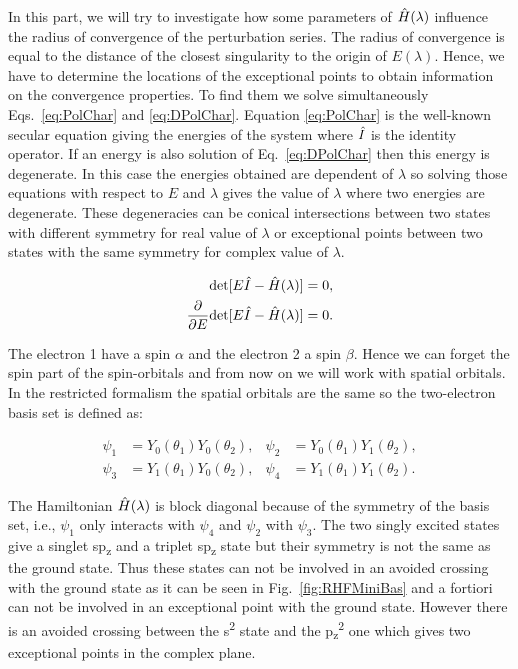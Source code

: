 \documentclass[11pt,a4paper]{article}
\newcommand{\hH}{\Hat{H}}
\newcommand{\hI}{\Hat{I}}
\begin{document}
In this part, we will try to investigate how some parameters of $\hH(\lambda)$ influence the radius of convergence of the perturbation series. The radius of convergence is equal to the distance of the closest singularity to the origin of $E(\lambda)$. Hence, we have to determine the locations of the exceptional points to obtain information on the convergence properties. To find them we solve simultaneously Eqs.~\eqref{eq:PolChar} and \eqref{eq:DPolChar}. Equation \eqref{eq:PolChar} is the well-known secular equation giving the energies of the system where $\hI$ is the identity operator. If an energy is also solution of Eq.~\eqref{eq:DPolChar} then this energy is degenerate. In this case the energies obtained are dependent of $\lambda$ so solving those equations with respect to $E$ and $\lambda$ gives the value of $\lambda$ where two energies are degenerate. These degeneracies can be conical intersections between two states with different symmetry for real value of $\lambda$ or exceptional points between two states with the same symmetry for complex value of $\lambda$.

\begin{subequations}
\begin{align}
	\label{eq:PolChar}
	\text{det}[E\hI-\hH(\lambda)] & = 0,
	\\ 
	\label{eq:DPolChar}
	\pdv{E}\text{det}[E\hI-\hH(\lambda)] & = 0.
\end{align}
\end{subequations}

The electron 1 have a spin $\alpha$ and the electron 2 a spin $\beta$. Hence we can forget the spin part of the spin-orbitals and from now on we will work with spatial orbitals. In the restricted formalism the spatial orbitals are the same so the two-electron basis set is defined as:

\begin{align}\label{eq:rhfbasis}
 \psi_1 & =Y_{0}(\theta_1)Y_{0}(\theta_2),
 & 
 \psi_2 & =Y_{0}(\theta_1)Y_{1}(\theta_2),\\
 \psi_3 & =Y_{1}(\theta_1)Y_{0}(\theta_2),
 & 
 \psi_4 & =Y_{1}(\theta_1)Y_{1}(\theta_2).
\end{align}

The Hamiltonian $\hH(\lambda)$ is block diagonal because of the symmetry of the basis set, i.e., $\psi_1$ only interacts with $\psi_4$ and $\psi_2$ with $\psi_3$. The two singly excited states give a singlet sp\textsubscript{z} and a triplet sp\textsubscript{z} state but their symmetry is not the same as the ground state. Thus these states can not be involved in an avoided crossing with the ground state as it can be seen in Fig.~\ref{fig:RHFMiniBas} and a fortiori can not be involved in an exceptional point with the ground state. However there is an avoided crossing between the s\textsuperscript{2} state and the p\textsubscript{z}\textsuperscript{2} one which gives two exceptional points in the complex plane. 
\end{document}
